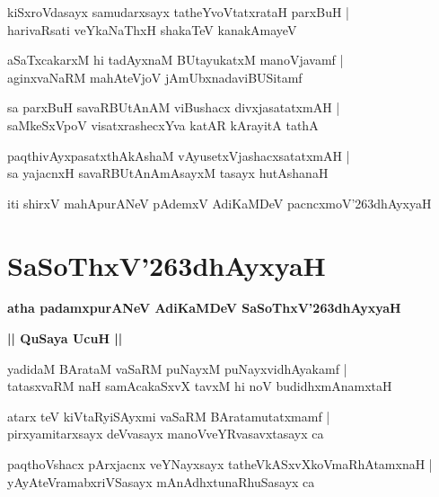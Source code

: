 \documentclass[twoside,12pt,openright]{book}
\def\S{\char'263}
\newcounter{shloka}[chapter]
\def\uvaca#1{\centerline{{\large\textbf{#1}}}}
\begin{document}
\begin{shloka}
kiSxroVdasayx samudarxsayx tatheYvoVtatxrataH parxBuH |\\
harivaRsati veYkaNaThxH shakaTeV kanakAmayeV 
\end{shloka}

\begin{shloka}
aSaTxcakarxM hi tadAyxnaM BUtayukatxM manoVjavamf |\\
aginxvaNaRM mahAteVjoV jAmUbxnadaviBUSitamf
\end{shloka}

\begin{shloka}
sa parxBuH savaRBUtAnAM viBushacx divxjasatatxmAH |\\
saMkeSxVpoV visatxrashecxYva katAR kArayitA tathA
\end{shloka}

\begin{shloka}
paqthivAyxpasatxthAkAshaM vAyusetxVjashacxsatatxmAH |\\
sa yajacnxH  savaRBUtAnAmAsayxM tasayx hutAshanaH
\end{shloka}

\begin{center}
iti shirxV mahApurANeV pAdemxV AdiKaMDeV pacncxmoV\S dhAyxyaH
\end{center}

\chapter{SaSoThxV\S dhAyxyaH}

\begin{center}
{\LARGE\bfseries atha padamxpurANeV AdiKaMDeV SaSoThxV\S dhAyxyaH}
\end{center}

\uvaca{|| QuSaya UcuH ||}

\begin{shloka}
yadidaM BArataM vaSaRM puNayxM puNayxvidhAyakamf |\\
tatasxvaRM naH samAcakaSxvX tavxM hi noV budidhxmAnamxtaH
\end{shloka}

\begin{shloka}
atarx teV kiVtaRyiSAyxmi vaSaRM BAratamutatxmamf |\\
pirxyamitarxsayx deVvasayx manoVveYRvasavxtasayx ca
\end{shloka}

\begin{shloka}
paqthoVshacx pArxjacnx veYNayxsayx tatheVkASxvXkoVmaRhAtamxnaH |\\
yAyAteVramabxriVSasayx mAnAdhxtunaRhuSasayx ca
\end{shloka}
\end{document}
